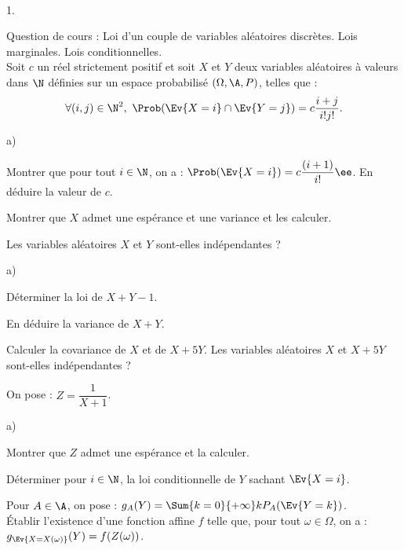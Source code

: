 \documentclass[11pt]{article}%
\begin{document}
\newpage


\begin{exerciceAP}~
  \begin{noliste}{1.}
    \setlength{\itemsep}{2mm}
  \item Question de cours : Loi d'un couple de variables aléatoires
    discrètes. Lois marginales. Lois conditionnelles.\\
    Soit $c$ un réel strictement positif et soit $X$ et $Y$ deux
    variables aléatoires à valeurs dans $\N$ définies sur un espace
    probabilisé $(\Omega,\A,P)$, telles que :
    \[
    \forall (i,j)\in\N^2, \ \Prob(\Ev{X=i}\cap\Ev{Y=j}) =
    c\dfrac{i+j}{i!j!}.
    \]
  \item 
    \begin{noliste}{a)}
    \setlength{\itemsep}{2mm}
    \item Montrer que pour tout $i\in\N$, on a :
      $\Prob(\Ev{X=i})=c\dfrac{(i+1)}{i!}\ee$. En déduire la valeur de
      $c$.
    \item Montrer que $X$ admet une espérance et une variance et les
      calculer.
    \item Les variables aléatoires $X$ et $Y$ sont-elles indépendantes
      ?
    \end{noliste}
  \item
    \begin{noliste}{a)}
    \setlength{\itemsep}{2mm}
    \item Déterminer la loi de $X+Y-1$.
    \item En déduire la variance de $X+Y$.
    \item Calculer la covariance de $X$ et de $X+5Y$. Les variables
      aléatoires $X$ et $X+5Y$ sont-elles indépendantes ?
    \end{noliste}

  \item On pose : $Z=\dfrac{1}{X+1}$.
    \begin{noliste}{a)}
    \setlength{\itemsep}{2mm}
    \item Montrer que $Z$ admet une espérance et la calculer.
    \item Déterminer pour $i\in\N$, la loi conditionnelle de $Y$
      sachant $\Ev{X=i}$.
    \item Pour $A\in\A$, on pose : $g_A(Y)=\Sum{k=0}{+\infty} k
      P_A(\Ev{Y=k})$.\\
      Établir l'existence d'une fonction affine $f$ telle que, pour
      tout $\omega\in\Omega$, on a : $g_{\Ev{X=X(\omega)}}(Y) =
      f(Z(\omega))$.
    \end{noliste}
  \end{noliste}
\end{exerciceAP}
\end{document}
